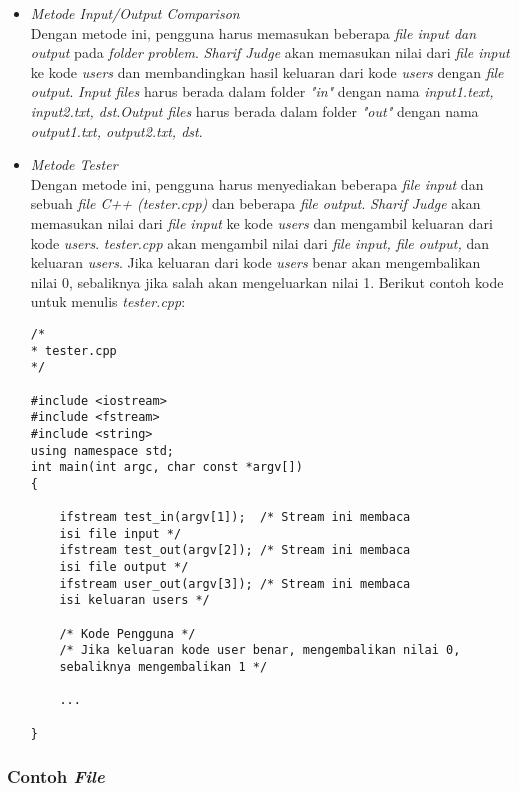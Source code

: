 \begin{itemize}
	\item \textit{Metode Input/Output Comparison} \\
	Dengan metode ini, pengguna harus memasukan beberapa \textit{file input dan output} pada \textit{folder} \textit{problem}. \textit{Sharif Judge} akan memasukan nilai dari \textit{file input} ke kode \textit{users} dan membandingkan hasil keluaran dari kode \textit{users} dengan \textit{file output}. \textit{Input files} harus berada dalam folder \textit{"in"} dengan nama \textit{input1.text, input2.txt, dst}.\textit{Output files} harus berada dalam folder \textit{"out"} dengan nama \textit{output1.txt, output2.txt, dst}.
	
	\item \textit{Metode Tester} \\
	Dengan metode ini, pengguna harus menyediakan beberapa \textit{file input} dan sebuah \textit{file C++ (tester.cpp)} dan beberapa \textit{file output}. \textit{Sharif Judge} akan memasukan nilai dari \textit{file input} ke kode \textit{users} dan mengambil keluaran dari kode \textit{users}. \textit{tester.cpp} akan mengambil nilai dari \textit{file input, file output, }dan keluaran \textit{users}. Jika keluaran dari kode \textit{users} benar akan mengembalikan nilai 0, sebaliknya jika salah akan mengeluarkan nilai 1. Berikut contoh kode untuk menulis \textit{tester.cpp}:
	\begin{lstlisting}[basicstyle=\ttfamily, frame=single,
columns=fullflexible, keepspaces=true, breaklines=true]
/*
* tester.cpp
*/

#include <iostream>
#include <fstream>
#include <string>
using namespace std;
int main(int argc, char const *argv[])
{
	
	ifstream test_in(argv[1]);  /* Stream ini membaca 
	isi file input */
	ifstream test_out(argv[2]); /* Stream ini membaca 
	isi file output */
	ifstream user_out(argv[3]); /* Stream ini membaca 
	isi keluaran users */
	
	/* Kode Pengguna */
	/* Jika keluaran kode user benar, mengembalikan nilai 0, 
	sebaliknya mengembalikan 1 */
	
	...

}
\end{lstlisting}
\end{itemize}

\subsubsection{Contoh \textit{File}}

